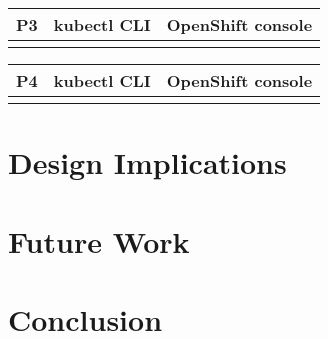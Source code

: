 \documentclass[11pt, oneside]{article}   	%
\begin{document}
\begin{center}
\begin{tabular}{ | c | c | c | } 
  \hline
  P3 & kubectl CLI & OpenShift console \\ 
  \hline
   &  &  \\ 
  \hline
\end{tabular}
\end{center}

\begin{center}
\begin{tabular}{ | c | c | c | } 
  \hline
  P4 & kubectl CLI & OpenShift console \\ 
  \hline
   &  &  \\ 
  \hline
\end{tabular}
\end{center}

\section{Design Implications}

\section{Future Work}

\section{Conclusion}



\end{document}
